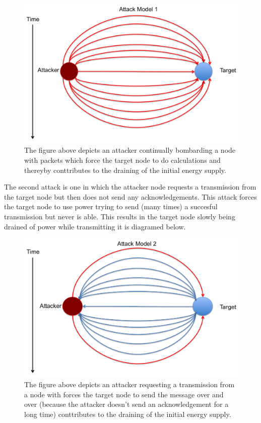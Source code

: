 \begin{figure}[h!]
\centering
{}
\includegraphics[width=\linewidth]{Figures/AModel1.png}
\caption{The figure above depicts an attacker continually bombarding a node with packets which force the target node to do calculations and thereyby conttributes to the draining of the initial energy supply.}
\end{figure}

The second attack is one in which the attacker node requests a transmission from the target node but then does not send any acknowledgements. This attack forces the target node to use power trying to send (many times) a succesful transmission but never is able. This results in the target node slowly being drained of power while transmitting it is diagramed below. 

\begin{figure}[h!]
\centering
{}
\includegraphics[width=\linewidth]{Figures/AModel2.png}
\caption{The figure above depicts an attacker requesting a transmission from a node with forces the target node to send the message over and over (because the attacker doesn't send an acknowledgement for a long time) conttributes to the draining of the initial energy supply.}
\end{figure}


